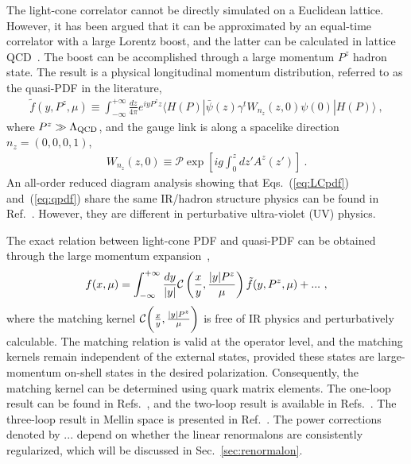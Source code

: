 \documentclass[a4paper,11pt]{article}
\begin{document}
The light-cone correlator cannot be directly simulated on a Euclidean lattice. However, it has been argued that it can be approximated by an equal-time correlator with a large Lorentz boost, and the latter
can be calculated in lattice QCD~\cite{Ji:2013dva,Ji:2014gla,Ji:2020ect,Ji:2024oka}. The boost
can be accomplished through a large momentum $P^z$ hadron
state. The result is a physical longitudinal momentum distribution, referred to as the quasi-PDF in the literature,
\begin{align}\label{eq:qpdf}
    \tilde f(y,P^z,\mu) \equiv \int_{-\infty}^{+\infty} \frac{d z}{4\pi} e^{i y P^z z} 
    \langle H(P) | \bar{\psi}(z) \gamma^{t} W_{n_{z}}(z,0) \psi(0) | H(P) \rangle \ ,
\end{align}
where $P^z \gg \Lambda_{\rm QCD}$, and the gauge link is along a spacelike direction $n_z = (0,0,0,1)$,
\begin{align}
    W_{n_{z}}(z, 0) \equiv \mathcal{P} \exp\left[i g \int_{0}^{z} d z' A^{z}(z')\right] \ .
\end{align}
An all-order reduced diagram analysis showing that Eqs.~(\ref{eq:LCpdf}) and~(\ref{eq:qpdf}) share the same IR/hadron structure physics can be found in Ref.~\cite{Ma:2014jla, Ji:2020ect}. However, they are different in perturbative ultra-violet (UV) physics. 

The exact relation between light-cone PDF and quasi-PDF can be obtained through the large momentum expansion~\cite{Ji:2024oka},
\begin{align}\label{eq:LaMETmatching}
f(x,\mu) = \int_{-\infty}^{+\infty} \frac{d y}{|y|} {\cal C}\left(\frac{x}{y},\frac{|y| P^z}{\mu}\right) \tilde f(y,P^z,\mu) + ... \ ,
\end{align}
where the matching kernel ${\cal C}\bigg(\frac{x}{y},\frac{|y| P^z}{\mu}\bigg)$ is free of IR physics and perturbatively calculable. The matching relation is valid at the operator level, and the matching kernels remain independent of the external states, provided these states are large-momentum on-shell states in the desired polarization. Consequently, the matching kernel can be determined using quark matrix elements. The one-loop result can be found in Refs.~\cite{Xiong:2013bka,Izubuchi:2018srq,Ji:2020ect}, and the two-loop result is available in Refs.~\cite{Li:2020xml,Chen:2020ody}. The three-loop result in Mellin space is presented in Ref.~\cite{Cheng:2024wyu}. The power corrections denoted by $...$ depend on whether the linear renormalons are consistently regularized, which will be discussed in Sec.~\ref{sec:renormalon}.
\end{document}
